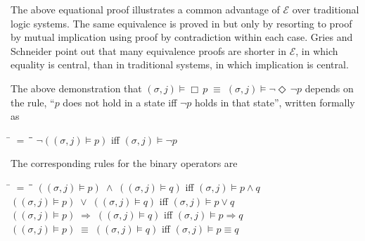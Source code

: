 \documentclass[12pt, fleqn, leqno]{article}
\newcommand{\mymathindent}{24pt}                    %
\newcommand{\equivs}{\ensuremath{\;\equiv\;}}       %
\newcommand{\impl}{\ensuremath{\Rightarrow}}        %
\newcommand{\Event}{\Diamond\,}
\newcommand{\Always}{\Box\,}
\newcommand{\myqedtab}{\hspace{384pt}}              %
\begin{document}
The above equational proof illustrates a common advantage of $\mathcal{E}$ over traditional logic systems.
The same equivalence is proved in \cite{Ben} but only by resorting to proof by mutual implication using proof by contradiction within each case.
Gries and Schneider \cite{LADM} point out that many equivalence proofs are shorter in $\mathcal{E}$, in which equality is central, than in traditional systems, in which implication is central.

The above demonstration that $(\sigma, j) \models \Always p \equivs (\sigma, j) \models \neg \Event \neg p$ depends on the
rule, ``$p$ does not hold in a state iff $\neg p$ holds in that state'', written formally as
\begin{tabbing}
\hspace{\mymathindent} \= $= \;$ \= \myqedtab \= \kill
  \> $\neg ((\sigma, j) \models p)$ \quad iff \quad $(\sigma, j) \models \neg p$
\end{tabbing}
The corresponding rules for the binary operators are
\begin{tabbing}
\hspace{\mymathindent} \= $= \;$ \= \myqedtab \= \kill
  \> $((\sigma, j) \models p) \;\land\; ((\sigma, j) \models q)$ \quad iff \quad $(\sigma, j) \models p\land q$\\
  \> $((\sigma, j) \models p) \;\lor\; ((\sigma, j) \models q)$ \quad iff \quad $(\sigma, j) \models p\lor q$\\
  \> $((\sigma, j) \models p) \;\impl\; ((\sigma, j) \models q)$ \quad iff \quad $(\sigma, j) \models p \impl q$\\
  \> $((\sigma, j) \models p) \;\equiv\; ((\sigma, j) \models q)$ \quad iff \quad $(\sigma, j) \models p \equiv q$
\end{tabbing}
\end{document}
